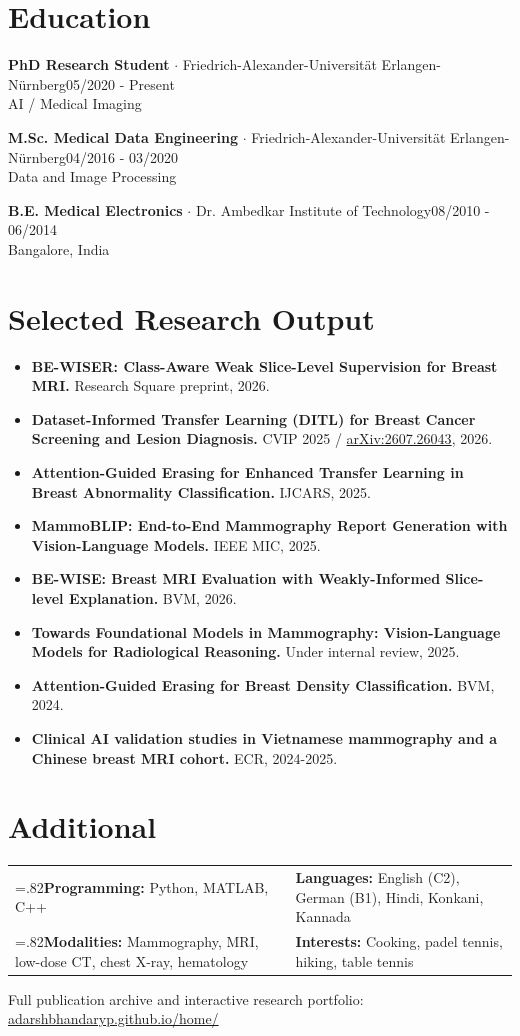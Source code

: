 \documentclass[10pt,a4paper]{article}
\newcommand{\compactrole}[4]{\textbf{#1} $\cdot$ \textcolor{accent}{#2}\hfill\textcolor{muted}{\footnotesize #3}\\[-1pt]\textcolor{muted}{\footnotesize #4}\par\vspace{3pt}}
\begin{document}
\section{Education}
\compactrole{PhD Research Student}{Friedrich-Alexander-Universit\"at Erlangen-N\"urnberg}{05/2020 - Present}{AI / Medical Imaging}
\compactrole{M.Sc. Medical Data Engineering}{Friedrich-Alexander-Universit\"at Erlangen-N\"urnberg}{04/2016 - 03/2020}{Data and Image Processing}
\compactrole{B.E. Medical Electronics}{Dr. Ambedkar Institute of Technology}{08/2010 - 06/2014}{Bangalore, India}

\section{Selected Research Output}
\begin{itemize}[leftmargin=3.5mm,itemsep=2.4pt]
  \item \textbf{BE-WISER: Class-Aware Weak Slice-Level Supervision for Breast MRI.} Research Square preprint, 2026.
  \item \textbf{Dataset-Informed Transfer Learning (DITL) for Breast Cancer Screening and Lesion Diagnosis.} CVIP 2025 / \href{https://arxiv.org/abs/2607.26043}{arXiv:2607.26043}, 2026.
  \item \textbf{Attention-Guided Erasing for Enhanced Transfer Learning in Breast Abnormality Classification.} IJCARS, 2025.
  \item \textbf{MammoBLIP: End-to-End Mammography Report Generation with Vision-Language Models.} IEEE MIC, 2025.
  \item \textbf{BE-WISE: Breast MRI Evaluation with Weakly-Informed Slice-level Explanation.} BVM, 2026.
  \item \textbf{Towards Foundational Models in Mammography: Vision-Language Models for Radiological Reasoning.} Under internal review, 2025.
  \item \textbf{Attention-Guided Erasing for Breast Density Classification.} BVM, 2024.
  \item \textbf{Clinical AI validation studies in Vietnamese mammography and a Chinese breast MRI cohort.} ECR, 2024-2025.
\end{itemize}

\section{Additional}
\begin{tabularx}{\textwidth}{@{}>{\hsize=.82\hsize}X >{\hsize=1.18\hsize}X@{}}
\textbf{Programming:} Python, MATLAB, C++ & \textbf{Languages:} English (C2), German (B1), Hindi, Konkani, Kannada\\[3pt]
\textbf{Modalities:} Mammography, MRI, low-dose CT, chest X-ray, hematology & \textbf{Interests:} Cooking, padel tennis, hiking, table tennis
\end{tabularx}

\vfill
\textcolor{muted}{\footnotesize Full publication archive and interactive research portfolio: \href{https://adarshbhandaryp.github.io/home/}{adarshbhandaryp.github.io/home/}}
\end{document}
